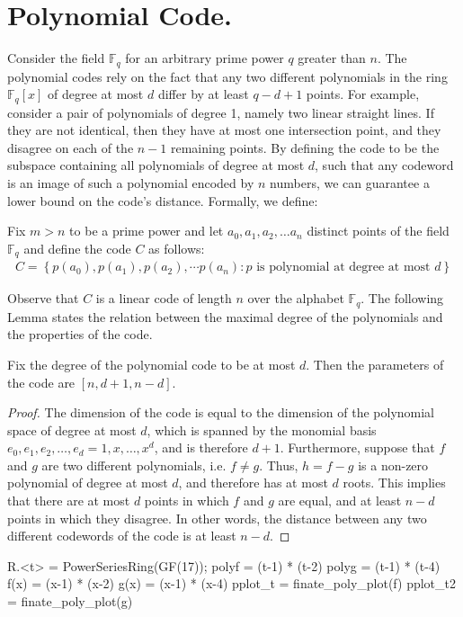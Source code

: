 
\newcommand{\FF}{\mathbb{F}_{q}}
\section{Polynomial Code.} Consider the field $\FF$ for an arbitrary prime power $q$ greater than $n$. The polynomial codes rely on the fact that any two different polynomials in the ring $\FF\left[ x \right]$ of degree at most $d$ differ by at least $q - d + 1$ points. For example, consider a pair of polynomials of degree 1, namely two linear straight lines. If they are not identical, then they have at most one intersection point, and they disagree on each of the $n-1$ remaining points. By defining the code to be the subspace containing all polynomials of degree at most $d$, such that any codeword is an image of such a polynomial encoded by $n$ numbers, we can guarantee a lower bound on the code's distance. Formally, we define:
\begin{definition}
  Fix $m > n $ to be a prime power and let $a_{0},a_{1},a_{2},\ldots a_{n}$ distinct points of the field $\FF$  and define the code $C$ as follows:  
  \begin{equation*}
    \begin{split}
      C = \left\{p\left(a_{0}\right),p\left(a_{1}\right),p\left(a_{2}\right),\cdots p\left(a_{n}\right) : p \text{ is polynomial at degree at most } d \right\}
    \end{split}
  \end{equation*}
\end{definition}
Observe that $C$ is a linear code of length $n$ over the alphabet $\FF$. The following Lemma states the relation between the maximal degree of the polynomials and the properties of the code.
\begin{lemma}
Fix the degree of the polynomial code to be at most $d$. Then the parameters of the code are $[n, d+1, n-d]$.
  \label{polycode}
\end{lemma}
\begin{proof}
The dimension of the code is equal to the dimension of the polynomial space of degree at most $d$, which is spanned by the monomial basis $e_{0}, e_{1}, e_{2}, \dots, e_{d} = 1, x, \dots, x^{d}$, and is therefore $d+1$. Furthermore, suppose that $f$ and $g$ are two different polynomials, i.e. $f \neq g$. Thus, $h = f-g$ is a non-zero polynomial of degree at most $d$, and therefore has at most $d$ roots. This implies that there are at most $d$ points in which $f$ and $g$ are equal, and at least $n-d$ points in which they disagree. In other words, the distance between any two different codewords of the code is at least $n-d$.
\end{proof}
\begin{sagesilent}
R.<t> = PowerSeriesRing(GF(17));
polyf = (t-1) * (t-2)
polyg = (t-1) * (t-4)
f(x) = (x-1) * (x-2)
g(x) = (x-1) * (x-4)
pplot_t = finate_poly_plot(f)
pplot_t2 = finate_poly_plot(g)
\end{sagesilent}
 
\begin{figure}[H]
  \label{fig:polyexample}
\end{figure}




